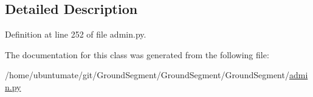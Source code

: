 \subsection{Detailed Description}


Definition at line 252 of file admin.\+py.



The documentation for this class was generated from the following file\+:\begin{DoxyCompactItemize}
\item 
/home/ubuntumate/git/\+Ground\+Segment/\+Ground\+Segment/\+Ground\+Segment/\hyperlink{admin_8py}{admin.\+py}\end{DoxyCompactItemize}
